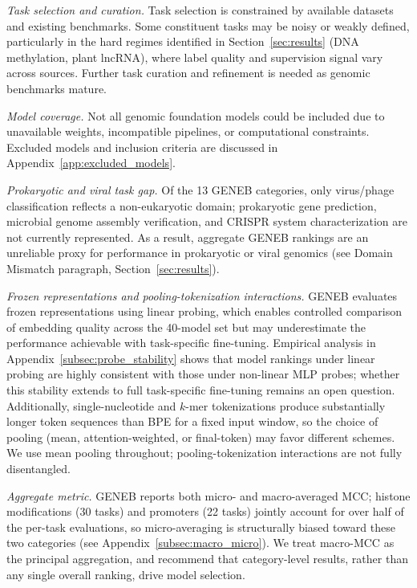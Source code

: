\documentclass{llmxive}
\begin{document}
\textit{Task selection and curation.} Task selection is constrained
by available datasets and existing benchmarks. Some constituent tasks
may be noisy or weakly defined, particularly in the hard regimes
identified in Section~\ref{sec:results} (DNA methylation, plant
lncRNA), where label quality and supervision signal vary across
sources. Further task curation and refinement is needed as genomic
benchmarks mature.

\textit{Model coverage.} Not all genomic foundation models could be
included due to unavailable weights, incompatible pipelines, or
computational constraints. Excluded models and inclusion criteria are
discussed in Appendix~\ref{app:excluded_models}.

\textit{Prokaryotic and viral task gap.} Of the 13 GENEB categories,
only virus/phage classification reflects a non-eukaryotic domain;
prokaryotic gene prediction, microbial genome assembly verification,
and CRISPR system characterization are not currently represented. As
a result, aggregate GENEB rankings are an unreliable proxy for
performance in prokaryotic or viral genomics (see Domain Mismatch
paragraph, Section~\ref{sec:results}).

\textit{Frozen representations and pooling-tokenization interactions.}
GENEB evaluates frozen representations using linear probing, which
enables controlled comparison of embedding quality across the
40-model set but may underestimate the performance achievable with
task-specific fine-tuning. Empirical analysis in
Appendix~\ref{subsec:probe_stability} shows that model rankings under
linear probing are highly consistent with those under non-linear MLP
probes; whether this stability extends to full task-specific
fine-tuning remains an open question. Additionally, single-nucleotide
and $k$-mer tokenizations produce substantially longer token
sequences than BPE for a fixed input window, so the choice of pooling
(mean, attention-weighted, or final-token) may favor different
schemes. We use mean pooling throughout; pooling-tokenization
interactions are not fully disentangled.

\textit{Aggregate metric.} GENEB reports both micro- and
macro-averaged MCC; histone modifications (30 tasks) and promoters
(22 tasks) jointly account for over half of the per-task evaluations,
so micro-averaging is structurally biased toward these two categories
(see Appendix~\ref{subsec:macro_micro}). We treat macro-MCC as the
principal aggregation, and recommend that category-level results,
rather than any single overall ranking, drive model selection.
\end{document}
